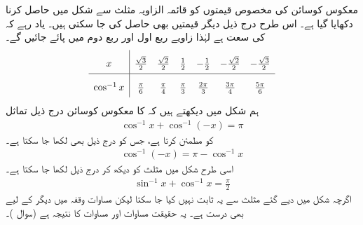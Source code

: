 معکوس کوسائن کی مخصوص قیمتوں کو قائمہ الزاویہ مثلث سے شکل  میں حاصل کرنا دکھایا گیا ہے۔ اس طرح درج ذیل دیگر قیمتیں بھی حاصل کی جا سکتی ہیں۔ یاد رہے کہ  کی سعت  ہے  لہٰذا زاویے ربع اول اور ربع دوم میں پائے جائیں گے۔
\begin{align*}
\renewcommand{\arraystretch}{2} 
\begin{array}{c|cccccc}
x&\tfrac{\sqrt{3}}{2}&\tfrac{\sqrt{2}}{2}&\tfrac{1}{2}&-\tfrac{1}{2}&-\tfrac{\sqrt{2}}{2}&-\tfrac{\sqrt{3}}{2}\\
\hline
\cos^{-1}x&\tfrac{\pi}{6}&\tfrac{\pi}{4}&\tfrac{\pi}{3}&\tfrac{2\pi}{3}&\tfrac{3\pi}{4}&\tfrac{5\pi}{6}
\end{array}
\end{align*}
ہم شکل  میں دیکھتے ہیں کہ  کا معکوس  کوسائن درج ذیل  تماثل
\begin{align}\label{مساوات_ماورائی_تماثل_الف}
\cos^{-1}x+\cos^{-1}(-x)=\pi
\end{align}
کو مطمئن کرتا ہے،  جس کو درج ذیل بھی لکھا جا سکتا ہے۔
\begin{align}\label{مساوات_ماورائی_تماثل_ب}
\cos^{-1}(-x)=\pi-\cos^{-1}x
\end{align}
اسی طرح شکل  میں مثلث کو دیکھ کر درج ذیل لکھا جا سکتا ہے۔
\begin{align}\label{مساوات_ماورائی_تماثل_ج}
\sin^{-1}x+\cos^{-1}x=\frac{\pi}{2}
\end{align}
اگرچہ شکل  میں دیے گئے مثلث سے یہ ثابت نہیں کیا جا سکتا   لیکن مساوات  وقفہ  میں دیگر  کے لیے بھی درست ہے۔ یہ حقیقت مساوات  اور مساوات  کا نتیجہ ہے (سوال )۔
